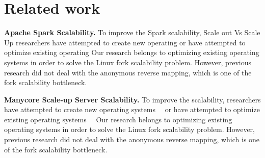 \section{Related work} \label{sec:RelatedWork}

\ifkor
\noindent
\textbf{Apache Spark Scalability.}
To improve the Spark scalability, Scale out Vs Scale Up
researchers have attempted to create new operating
or have attempted to optimize existing operating
Our research belongs to optimizing existing operating systems in order to
solve the Linux fork scalability problem.
However, previous research did not deal with the anonymous reverse mapping,
which is one of the fork scalability bottleneck.

\else

\fi

\ifkor
\noindent
\textbf{Manycore Scale-up Server Scalability.}
To improve the scalability, researchers have attempted to create new
operating
systems~\cite{Boyd-WickizerCorey}~\cite{Baumann2009Barrelfish}
or have
attempted to optimize existing operating
systems~\cite{SilasBoydWickizer2010LinuxScales48}~\cite{AustinTClements2012RCUBalancedTrees}
Our research belongs to optimizing existing operating systems in order to
solve the Linux fork scalability problem.
However, previous research did not deal with the anonymous reverse mapping,
which is one of the fork scalability bottleneck.

\else

\fi
